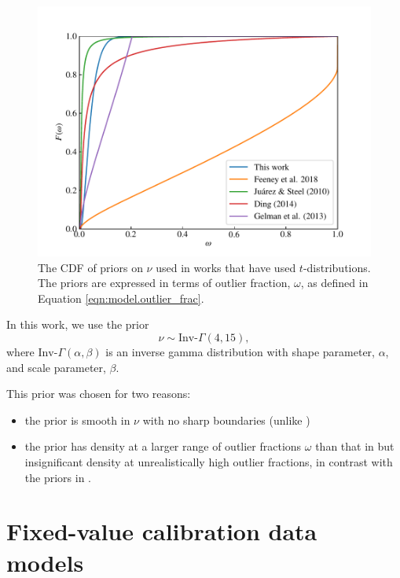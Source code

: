 \documentclass[fleqn,usenatbib]{rasti}
\begin{document}
\begin{figure}
	\includegraphics[width=\columnwidth]{graphics/cdf_outlier_frac}
    \caption{The CDF of priors on $\nu$ used in works that have used
    $t$-distributions. The priors are expressed in terms of outlier fraction,
    $\omega$, as defined in Equation \ref{eqn:model.outlier_frac}.}
    \label{fig:priors.outlier_frac}
\end{figure}

In this work, we use the prior
\begin{equation}
    \nu \sim \text{Inv-}\Gamma(4, 15),
\end{equation}
where $\text{Inv-}\Gamma(\alpha, \beta)$ is an inverse gamma distribution with
shape parameter, $\alpha$, and scale parameter, $\beta$.

This prior was chosen for two reasons:
\begin{itemize}
    \item the prior is smooth in $\nu$ with no sharp boundaries (unlike
          \citet{Gelman:2013})
    \item the prior has density at a larger range of outlier fractions $\omega$
          than that in \citet{Juarez:2010} but insignificant density
          at unrealistically high outlier fractions, in contrast with the priors
          in \citet{Ding:2014, Feeney:2018}.
\end{itemize}

\section{Fixed-value calibration data models}
\label{sec:data-models}
\end{document}
